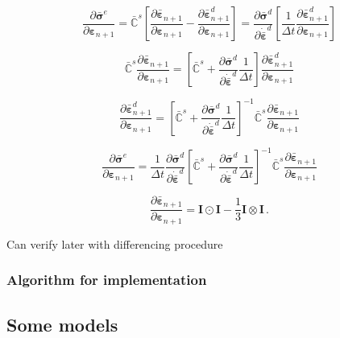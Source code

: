 \documentclass[12pt]{article}
\newcommand{\pder}[2]{\dfrac{\partial #1}{\partial #2}}
\begin{document}
\begin{equation}
\pder{\bar{\bm{\sigma}}^{e}}{\bm{\varepsilon}_{n+1}} = \bar{\mathbb{C}}^{s} \left[\pder{\bar{\bm{\varepsilon}}_{n+1}}{\bm{\varepsilon}_{n+1}} - \pder{\bar{\bm{\varepsilon}}^{d}_{n+1}}{\bm{\varepsilon}_{n+1}}\right] =  \pder{\bar{\bm{\sigma}}^{d}}{\dot{\bar{\bm{\varepsilon}}}^{d}}\left[\dfrac{1}{\Delta t}\pder{\bar{\bm{\varepsilon}}^{d}_{n+1}}{\bm{\varepsilon}_{n+1}} \right]
\end{equation}

\begin{equation}
\bar{\mathbb{C}}^{s} \pder{\bar{\bm{\varepsilon}}_{n+1}}{\bm{\varepsilon}_{n+1}}  = \left[\bar{\mathbb{C}}^{s} +  \pder{\bar{\bm{\sigma}}^{d}}{\dot{\bar{\bm{\varepsilon}}}^{d}}\dfrac{1}{\Delta t}\right]\pder{\bar{\bm{\varepsilon}}^{d}_{n+1}}{\bm{\varepsilon}_{n+1}} 
\end{equation}

\begin{equation}
\pder{\bar{\bm{\varepsilon}}^{d}_{n+1}}{\bm{\varepsilon}_{n+1}}  = \left[\bar{\mathbb{C}}^{s} +  \pder{\bar{\bm{\sigma}}^{d}}{\dot{\bar{\bm{\varepsilon}}}^{d}}\dfrac{1}{\Delta t}\right]^{-1}\bar{\mathbb{C}}^{s} \pder{\bar{\bm{\varepsilon}}_{n+1}}{\bm{\varepsilon}_{n+1}}  
\end{equation}


\begin{equation}
\pder{\bar{\bm{\sigma}}^{e}}{\bm{\varepsilon}_{n+1}}  = \dfrac{1}{\Delta t} \pder{\bar{\bm{\sigma}}^{d}}{\dot{\bar{\bm{\varepsilon}}}^{d}}\left[\bar{\mathbb{C}}^{s} +  \pder{\bar{\bm{\sigma}}^{d}}{\dot{\bar{\bm{\varepsilon}}}^{d}}\dfrac{1}{\Delta t}\right]^{-1}\bar{\mathbb{C}}^{s} \pder{\bar{\bm{\varepsilon}}_{n+1}}{\bm{\varepsilon}_{n+1}}  
\end{equation}

\begin{equation}
	\pder{\bar{\bm{\varepsilon}}_{n+1}}{\bm{\varepsilon}_{n+1}}  = \bm{I} \odot \bm{I} - \dfrac{1}{3}\bm{I} \otimes \bm{I} \,.
\end{equation}

Can verify later with differencing procedure

\subsubsection{Algorithm for implementation}

\subsection{Some models}
\end{document}
